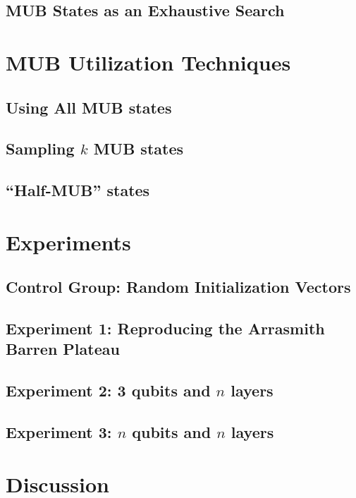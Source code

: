 \documentclass[a4paper,12pt]{article}
\begin{document}
\subsection{MUB States as an Exhaustive Search}


\section{MUB Utilization Techniques}

\subsection{Using All MUB states}

\subsection{Sampling $k$ MUB states}

\subsection{``Half-MUB'' states}


\section{Experiments}

\subsection{Control Group: Random Initialization Vectors}

\subsection{Experiment 1: Reproducing the Arrasmith Barren Plateau}

\subsection{Experiment 2: 3 qubits and $n$ layers}

\subsection{Experiment 3: $n$ qubits and $n$ layers}

\section{Discussion}

\printbibliography
\end{document}

